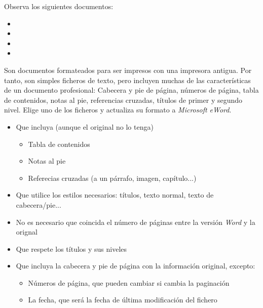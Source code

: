 \begin{homeworkProblem}
  Observa los siguientes documentos:
  \begin{itemize}
  \item {}
  \item {}
  \item {}
  \item {}      
  \end{itemize}

  Son documentos formateados para ser impresos con una impresora antigua. Por tanto, son simples ficheros de texto, pero incluyen muchas de las características de un documento profesional: Cabecera y pie de página,  números de página,  tabla de contenidos,  notas al pie,  referencias cruzadas,  títulos de primer y segundo nivel. Elige uno de los ficheros y actualiza su formato a \textit{Microsoft eWord}.



  \begin{Aviso}

    \begin{itemize}
    \item Que incluya (aunque el original no lo tenga)
      \begin{itemize}
      \item Tabla de contenidos
      \item Notas al pie
      \item Referecias cruzadas (a un párrafo, imagen, capítulo...)
      \end{itemize}
    \item Que utilice los estilos necesarios: títulos, texto normal, texto de cabecera/pie...
    \item No es necesario que coincida el número de páginas entre la versión \textit{Word} y la orignal    
    \item Que respete los títulos y sus niveles
    \item Que incluya la cabecera y pie de página con la información original, excepto:
      \begin{itemize}
      \item Números de página, que pueden cambiar si cambia la paginación
      \item La fecha, que será la fecha de última modificación del fichero
      \end{itemize}
    \end{itemize}
  \end{Aviso}
\end{homeworkProblem}

